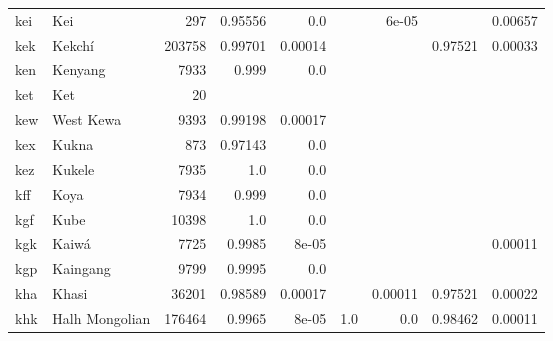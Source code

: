 \documentclass[11pt]{article}
\begin{document}
\begin{table*}[h]
{\begin{tabular}{llrrrrrrr}
kei         & Kei         & 297         & 0.95556         & 0.0         &          & 6e-05         &          & 0.00657         \\

kek         & Kekchí         & 203758         & 0.99701         & 0.00014         &          &          & 0.97521         & 0.00033         \\

ken         & Kenyang         & 7933         & 0.999         & 0.0         &          &          &          &          \\

ket         & Ket         & 20         &          &          &          &          &          &          \\

kew         & West Kewa         & 9393         & 0.99198         & 0.00017         &          &          &          &          \\

kex         & Kukna         & 873         & 0.97143         & 0.0         &          &          &          &          \\

kez         & Kukele         & 7935         & 1.0         & 0.0         &          &          &          &          \\

kff         & Koya         & 7934         & 0.999         & 0.0         &          &          &          &          \\

kgf         & Kube         & 10398         & 1.0         & 0.0         &          &          &          &          \\

kgk         & Kaiwá         & 7725         & 0.9985         & 8e-05         &          &          &          & 0.00011         \\

kgp         & Kaingang         & 9799         & 0.9995         & 0.0         &          &          &          &          \\

kha         & Khasi         & 36201         & 0.98589         & 0.00017         &          & 0.00011         & 0.97521         & 0.00022         \\

khk         & Halh Mongolian         & 176464         & 0.9965         & 8e-05         & 1.0         & 0.0         & 0.98462         & 0.00011         \\


\end{tabular}}
\end{table*}
\end{document}
